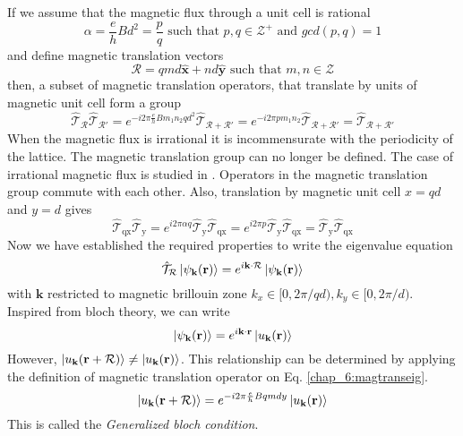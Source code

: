 If we assume that the magnetic flux through a unit cell is rational
\begin{equation}
 \alpha = \frac{e}{h}Bd^2 = \frac{p}{q} \text{ such that } p,q \in \mathcal{Z}^{+} \text{ and } gcd(p, q) = 1
\end{equation} and define magnetic translation vectors
\begin{equation}
 \mathcal{R} = qmd \hat{\mathbf{x}} + nd \hat{\mathbf{y}} \text{ such that } m,n \in \mathcal{Z}
\end{equation} then, a subset of magnetic translation operators, that translate by units of magnetic unit cell form a group
\begin{equation}
 \hat{\mathcal{T}}_{\mathcal{R}}\hat{\mathcal{T}}_{\mathcal{R}'} = e^{-i2\pi\frac{e}{h}Bm_{1}n_{2}qd^2}\hat{\mathcal{T}}_{\mathcal{R} + \mathcal{R}'} = e^{-i2\pi p m_{1}n_{2}}\hat{\mathcal{T}}_{\mathcal{R} + \mathcal{R}'} = \hat{\mathcal{T}}_{\mathcal{R} + \mathcal{R}'}
\end{equation} When the magnetic flux is irrational it is incommensurate with the periodicity of the lattice. The magnetic translation group can no longer be defined. The case of irrational magnetic flux is studied in \parencite{obermair1976bloch}. Operators in the magnetic translation group commute with each other. Also,
translation by magnetic unit cell $x=qd$ and $y=d$ gives 
\begin{equation}
 \hat{\mathcal{T}}_{\mathrm{qx}}\hat{\mathcal{T}}_{\mathrm{y}} = e^{i2\pi\alpha q}\hat{\mathcal{T}}_{\mathrm{y}}\hat{\mathcal{T}}_{\mathrm{qx}} = e^{i2\pi p}\hat{\mathcal{T}}_{\mathrm{y}}\hat{\mathcal{T}}_{\mathrm{qx}}=\hat{\mathcal{T}}_{\mathrm{y}}\hat{\mathcal{T}}_{\mathrm{qx}}
\end{equation}
Now we have established the required properties to write the eigenvalue equation
\begin{equation}
 \label{chap_6:magtranseig}\hat{\mathcal{T}}_{\mathcal{R}}\ket{\psi_{\mathbf{k}}(\mathbf{r})} = e^{i\mathbf{k}\cdot\mathcal{R}}\ket{\psi_{\mathbf{k}}(\mathbf{r})}
\end{equation} with $\mathbf{k}$ restricted to magnetic brillouin zone $k_{x} \in [0, 2\pi/qd), k_{y} \in [0, 2\pi/d)$. Inspired from bloch theory,
we can write
\begin{equation}
 \ket{\psi_{\mathbf{k}}(\mathbf{r})} = e^{i\mathbf{k}\cdot\mathbf{r}}\ket{u_{\mathbf{k}}(\mathbf{r})}
\end{equation} However, $\ket{u_{\mathbf{k}}(\mathbf{r}+\mathcal{R})} \neq \ket{u_{\mathbf{k}}(\mathbf{r})}$. This relationship can be determined by applying the definition
of magnetic translation operator on Eq. \eqref{chap_6:magtranseig}.
\begin{equation}
 \ket{u_{\mathbf{k}}(\mathbf{r} + \mathcal{R})} = e^{-i2\pi\frac{e}{h}Bqmdy}\ket{u_{\mathbf{k}}(\mathbf{r})}
\end{equation} This is called the \emph{Generalized bloch condition}.

